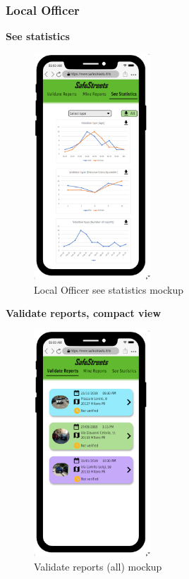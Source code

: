 				\subsubsection{Local Officer}
				\vspace{-2mm}
				\begin{center}
					{\small \textbf{See statistics}}
				\end{center}
				\vspace{-5mm}
				\begin{figure}[!h]
					\centering
					\includegraphics[height=8.5cm]{images/MockUp/Authority/LocalOfficer/SeeStatistics.png}
					\caption{Local Officer see statistics mockup}
				\end{figure}
				\clearpage
				\begin{center}
						{\small \textbf{Validate reports, compact view}}
					\end{center}
					\vspace{-5mm}
					\begin{figure}[!h]
						\centering
						\includegraphics[height=8.5cm]{images/MockUp/Authority/LocalOfficer/ValidateReport.png}
						\caption{Validate reports (all) mockup}
					\end{figure}
